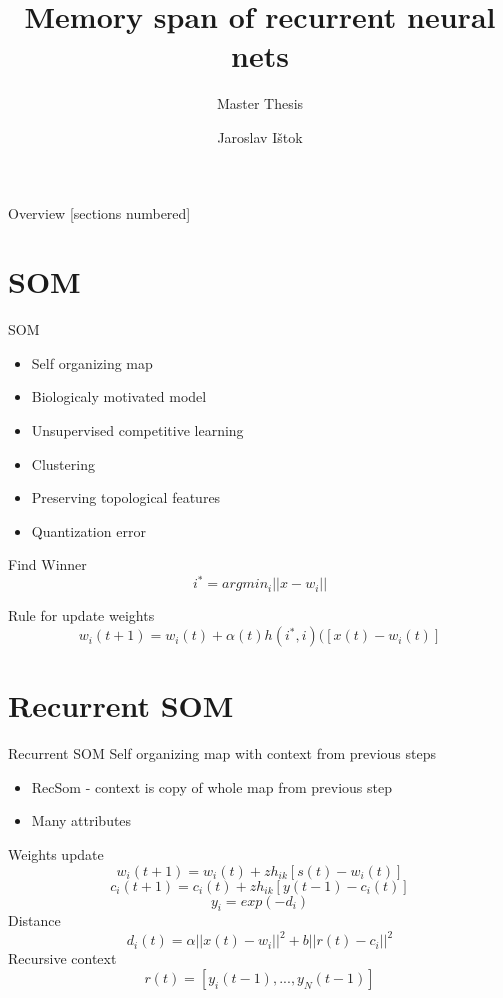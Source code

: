 \documentclass[10pt]{beamer}
\title{Memory span of recurrent neural nets}
\subtitle{Master Thesis}
\date{}
\author{Jaroslav Ištok}
\begin{document}
\maketitle

\begin{frame}{Overview}
  [sections numbered]
  \tableofcontents[hideallsubsections]
\end{frame}

\section{SOM}


\begin{frame}[fragile]{SOM}

\begin{itemize}
\item Self organizing map
\item Biologicaly motivated model
\item Unsupervised competitive learning
\item Clustering
\item Preserving topological features
\item Quantization error
\end{itemize}

Find Winner
\begin{equation*}
i^* = argmin_i||x-w_i|| 
\end{equation*}

Rule for update weights
\begin{equation*}
w_i(t+1) = w_i(t) + \alpha(t)h(i^*, i)([x(t) - w_i(t)]
\end{equation*}

\end{frame}

\section{Recurrent SOM}

\begin{frame}[fragile]{Recurrent SOM}
Self organizing map with context from previous steps
\begin{itemize}
\item RecSom - context is copy of whole map from previous step
\item Many attributes
\end{itemize}
Weights update
\begin{equation*}
w_i(t+1) = w_i(t) + zh_{ik}[s(t) - w_i(t)]
\end{equation*}
\begin{equation*}
c_i(t+1) = c_i(t) + zh_{ik}[y(t - 1) - c_i(t)]
\end{equation*}
\begin{equation*}
y_i=exp(-d_i)
\end{equation*}
Distance
\begin{equation*}
d_i(t) = \alpha||x(t)-w_i||^2 + b||r(t)-c_i||^2
\end{equation*}
Recursive context
\begin{equation*}
r(t)=[y_i(t-1),...,y_N(t-1)]
\end{equation*}
\end{frame}
\end{document}

